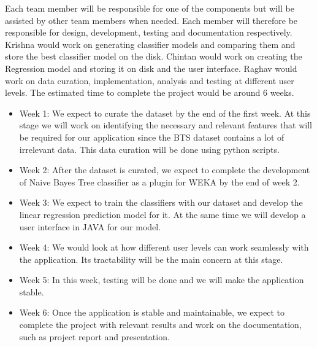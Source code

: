 \begin{itemize}
Each team member will be responsible for one of the components but will be assisted by other team members when needed. Each member will therefore be responsible for design, development, testing and documentation respectively. Krishna would work on generating classifier models and comparing them and store the best classifier model on the disk. Chintan would work on creating the Regression model and storing it on disk and the user interface. Raghav would work on data curation, implementation, analysis and testing at different user levels. The estimated time to complete the project would be around 6 weeks.

\begin{itemize} 
	\item{Week 1: We expect to curate the dataset by the end of the first week. At this stage we will work on identifying the necessary and relevant features that will be required for our application since the BTS dataset contains a lot of irrelevant data. This data curation will be done using python scripts.}
    \item{Week 2: After the dataset is curated, we expect to complete the development of Naive Bayes Tree classifier as a plugin for WEKA by the end of week 2.}
    \item{Week 3: We expect to train the classifiers with our dataset and develop the linear regression prediction model for it. At the same time we will develop a user interface in JAVA for our model.}
    \item{Week 4: We would look at how different user levels can work seamlessly with the application. Its tractability will be the main concern at this stage.}
    \item{Week 5: In this week, testing will be done and we will make the application stable.}
    \item{Week 6: Once the application is stable and maintainable, we expect to complete the project with relevant results and work on the documentation, such as project report and presentation.}
    \end{itemize}
\end{itemize}
